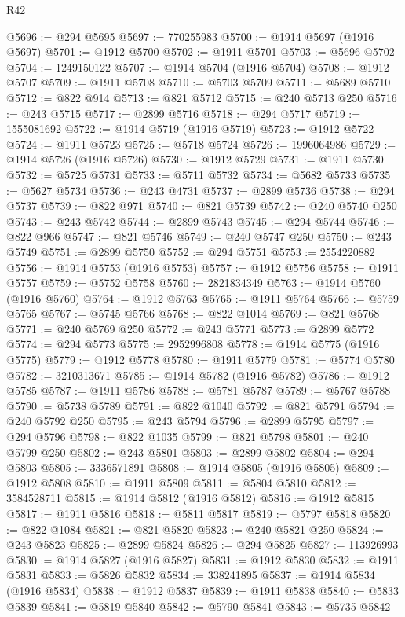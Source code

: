 \begin{lexlean}{R42}
\begin{coremodule}
{@5696 := @294 @5695
@5697 := 770255983
@5700 := @1914 @5697 (@1916 @5697)
@5701 := @1912 @5700
@5702 := @1911 @5701
@5703 := @5696 @5702
@5704 := 1249150122
@5707 := @1914 @5704 (@1916 @5704)
@5708 := @1912 @5707
@5709 := @1911 @5708
@5710 := @5703 @5709
@5711 := @5689 @5710
@5712 := @822 @914
@5713 := @821 @5712
@5715 := @240 @5713 @250
@5716 := @243 @5715
@5717 := @2899 @5716
@5718 := @294 @5717
@5719 := 1555081692
@5722 := @1914 @5719 (@1916 @5719)
@5723 := @1912 @5722
@5724 := @1911 @5723
@5725 := @5718 @5724
@5726 := 1996064986
@5729 := @1914 @5726 (@1916 @5726)
@5730 := @1912 @5729
@5731 := @1911 @5730
@5732 := @5725 @5731
@5733 := @5711 @5732
@5734 := @5682 @5733
@5735 := @5627 @5734
@5736 := @243 @4731
@5737 := @2899 @5736
@5738 := @294 @5737
@5739 := @822 @971
@5740 := @821 @5739
@5742 := @240 @5740 @250
@5743 := @243 @5742
@5744 := @2899 @5743
@5745 := @294 @5744
@5746 := @822 @966
@5747 := @821 @5746
@5749 := @240 @5747 @250
@5750 := @243 @5749
@5751 := @2899 @5750
@5752 := @294 @5751
@5753 := 2554220882
@5756 := @1914 @5753 (@1916 @5753)
@5757 := @1912 @5756
@5758 := @1911 @5757
@5759 := @5752 @5758
@5760 := 2821834349
@5763 := @1914 @5760 (@1916 @5760)
@5764 := @1912 @5763
@5765 := @1911 @5764
@5766 := @5759 @5765
@5767 := @5745 @5766
@5768 := @822 @1014
@5769 := @821 @5768
@5771 := @240 @5769 @250
@5772 := @243 @5771
@5773 := @2899 @5772
@5774 := @294 @5773
@5775 := 2952996808
@5778 := @1914 @5775 (@1916 @5775)
@5779 := @1912 @5778
@5780 := @1911 @5779
@5781 := @5774 @5780
@5782 := 3210313671
@5785 := @1914 @5782 (@1916 @5782)
@5786 := @1912 @5785
@5787 := @1911 @5786
@5788 := @5781 @5787
@5789 := @5767 @5788
@5790 := @5738 @5789
@5791 := @822 @1040
@5792 := @821 @5791
@5794 := @240 @5792 @250
@5795 := @243 @5794
@5796 := @2899 @5795
@5797 := @294 @5796
@5798 := @822 @1035
@5799 := @821 @5798
@5801 := @240 @5799 @250
@5802 := @243 @5801
@5803 := @2899 @5802
@5804 := @294 @5803
@5805 := 3336571891
@5808 := @1914 @5805 (@1916 @5805)
@5809 := @1912 @5808
@5810 := @1911 @5809
@5811 := @5804 @5810
@5812 := 3584528711
@5815 := @1914 @5812 (@1916 @5812)
@5816 := @1912 @5815
@5817 := @1911 @5816
@5818 := @5811 @5817
@5819 := @5797 @5818
@5820 := @822 @1084
@5821 := @821 @5820
@5823 := @240 @5821 @250
@5824 := @243 @5823
@5825 := @2899 @5824
@5826 := @294 @5825
@5827 := 113926993
@5830 := @1914 @5827 (@1916 @5827)
@5831 := @1912 @5830
@5832 := @1911 @5831
@5833 := @5826 @5832
@5834 := 338241895
@5837 := @1914 @5834 (@1916 @5834)
@5838 := @1912 @5837
@5839 := @1911 @5838
@5840 := @5833 @5839
@5841 := @5819 @5840
@5842 := @5790 @5841
@5843 := @5735 @5842
}
\end{coremodule}
\end{lexlean}
